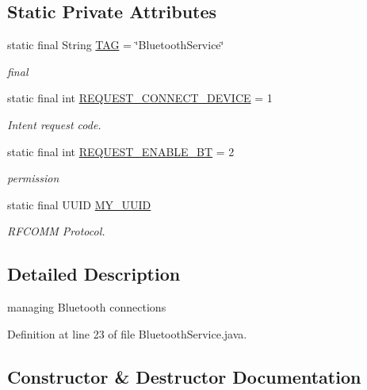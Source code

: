 \subsection*{Static Private Attributes}
\begin{DoxyCompactItemize}
\item 
static final String \mbox{\hyperlink{classhi_1_1world_1_1hello_1_1myapplication_1_1_bluetooth_service_a62016c21137a1fcc9208eef536ce7fd9}{T\+AG}} = \char`\"{}Bluetooth\+Service\char`\"{}
\begin{DoxyCompactList}\small\item\em final \end{DoxyCompactList}\item 
static final int \mbox{\hyperlink{classhi_1_1world_1_1hello_1_1myapplication_1_1_bluetooth_service_ae1da09c51c0833244e37542715cdba89}{R\+E\+Q\+U\+E\+S\+T\+\_\+\+C\+O\+N\+N\+E\+C\+T\+\_\+\+D\+E\+V\+I\+CE}} = 1
\begin{DoxyCompactList}\small\item\em Intent request code. \end{DoxyCompactList}\item 
static final int \mbox{\hyperlink{classhi_1_1world_1_1hello_1_1myapplication_1_1_bluetooth_service_a5e102a7114e1327f3016ba2910da9416}{R\+E\+Q\+U\+E\+S\+T\+\_\+\+E\+N\+A\+B\+L\+E\+\_\+\+BT}} = 2
\begin{DoxyCompactList}\small\item\em permission \end{DoxyCompactList}\item 
static final U\+U\+ID \mbox{\hyperlink{classhi_1_1world_1_1hello_1_1myapplication_1_1_bluetooth_service_abeb9aa3df7dd194901ebd5a465892e40}{M\+Y\+\_\+\+U\+U\+ID}}
\begin{DoxyCompactList}\small\item\em R\+F\+C\+O\+MM Protocol. \end{DoxyCompactList}\end{DoxyCompactItemize}


\subsection{Detailed Description}
managing Bluetooth connections 

Definition at line 23 of file Bluetooth\+Service.\+java.



\subsection{Constructor \& Destructor Documentation}
\mbox{\label{classhi_1_1world_1_1hello_1_1myapplication_1_1_bluetooth_service_a2c0b1d538e621bd607a6f90fd4f436a8}} 
